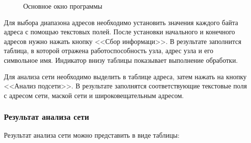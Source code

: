 \documentclass[a4paper]{article}
\begin{document}
		\begin{figure}[H]
			\caption{Основное окно программы}
		\end{figure}
		
		Для выбора диапазона адресов необходимо установить значения каждого байта адреса с помощью текстовых полей. После установки начального и конечного адресов нужно нажать кнопку <<Сбор информаци>>. В результате заполнится таблица, в которой отражена работоспособность узла, адрес узла и его символьное имя. Индикатор внизу таблицы показывает выполнение обработки.

		Для анализа сети необходимо выделить в таблице адреса, затем нажать на кнопку <<Анализ подсети>>. В результате заполнятся соответствующие текстовые поля с адресом сети, маской сети и широковещательным адресом.
		
		\subsubsection{Результат анализа сети}

Результат анализа сети можно представить в виде таблицы:
\end{document}
